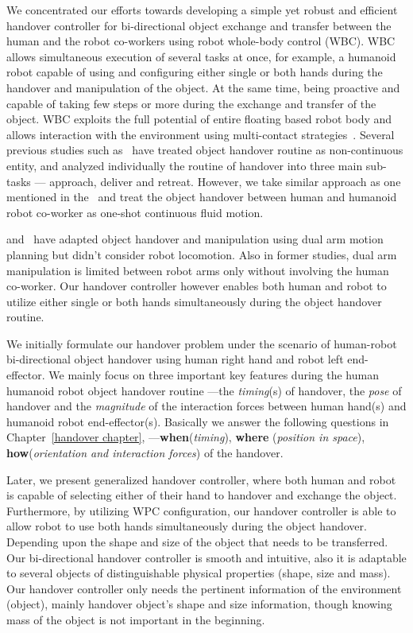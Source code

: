 We concentrated our efforts towards developing a simple yet robust and efficient handover controller for bi-directional object exchange and transfer between the human and the robot co-workers using robot whole-body control (WBC). WBC allows simultaneous execution of several tasks at once, for example, a humanoid robot capable of using and configuring either single or both hands during the handover and manipulation of the object. At the same time, being proactive and capable of taking few steps or more during the exchange and transfer of the object. WBC exploits the full potential of entire floating based robot body and allows interaction with the environment using multi-contact strategies~\cite{ladder-HRP-2Kai}. Several previous studies such as~\cite{strabala2013toward, huber2008human} have treated object handover routine as non-continuous entity, and analyzed individually the routine of handover into three main sub-tasks — approach, deliver and retreat. However, we take similar approach as one mentioned in the~\cite{medina2016human, nemlekarprompt} and treat the object handover between human and humanoid robot co-worker as one-shot continuous fluid motion.

\cite{vahrenkamp2009humanoid, vezzani2017novel} and~\cite{kim2004advanced} have adapted object handover and manipulation using dual arm motion planning but didn't consider robot locomotion. Also in former studies, dual arm manipulation is limited between robot arms only without involving the human co-worker. Our handover controller however enables both human and robot to utilize either single or both hands simultaneously during the object handover routine.

We initially formulate our handover problem under the scenario of human-robot bi-directional object handover using human right hand and robot left end-effector. We mainly focus on three important key features during the human humanoid robot object handover routine ---the \textit{timing}(s) of handover, the \textit{pose} of handover and the \textit{magnitude} of the interaction forces between human hand(s) and humanoid robot end-effector(s). Basically we answer the following questions in Chapter~\ref{handover chapter}, ---\textbf{when}(\textit{timing}), \textbf{where} (\textit{position in space}), \textbf{how}(\textit{orientation and interaction forces}) of the handover.

Later, we present generalized handover controller, where both human and robot is capable of selecting either of their hand to handover and exchange the object. Furthermore, by utilizing WPC configuration, our handover controller is able to allow robot to use both hands simultaneously during the object handover. Depending upon the shape and size of the object that needs to be transferred. Our bi-directional handover controller is smooth and intuitive, also it is adaptable to several objects of distinguishable physical properties (shape, size and mass). Our handover controller only needs the pertinent information of the environment (object), mainly handover object's shape and size information, though knowing mass of the object is not important in the beginning.

